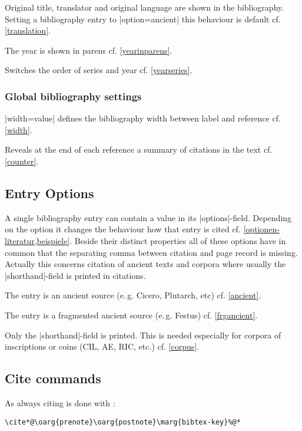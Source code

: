 \documentclass[a4paper,
10pt,
greek,
french,
spanish,
italian,
ngerman,
english
]{ltxdoc}
\begin{document}
Original title, translator and original language are shown in the bibliography. 
Setting a bibliography entry to |option={ancient}| this behaviour is default cf. \cref{translation}. 

The year is shown in parens cf. \cref{yearinparens}.

Switches the order of series and year cf. \cref{yearseries}.
 
\subsubsection{Global bibliography settings}

|width={value}| defines the bibliography width between label and reference cf. \cref{width}.

Reveals at the end of each reference a summary of citations in the text cf. \cref{counter}.

\subsection{Entry Options}
A single bibliography entry can contain a value in its |options|-field.
Depending on the option it changes the behaviour how that entry is cited cf. \cref{optionen-literatur,beispiele}. 
Beside their distinct properties all of these options have in common that the separating comma between citation and page record is missing. 
Actually this concerns citation of ancient texts and corpora where usually the |shorthand|-field is printed in citations.

The entry is an ancient source (e.\,g. Cicero, Plutarch, etc) cf. \cref{ancient}.

The entry is a fragmented ancient source (e.\,g. Festus) cf. \cref{frgancient}.

Only the |shorthand|-field is printed.
This is needed especially for corpora of inscriptions or coins (CIL, AE, RIC, etc.) cf. \cref{corpus}.


\subsection{Cite commands}\label{cite-commands}
\DescribeMacro{\cite}%
As always citing is done with :
\begin{lstlisting}
\cite*@\oarg{prenote}\oarg{postnote}\marg{bibtex-key}%@*
\end{lstlisting}
\end{document}

